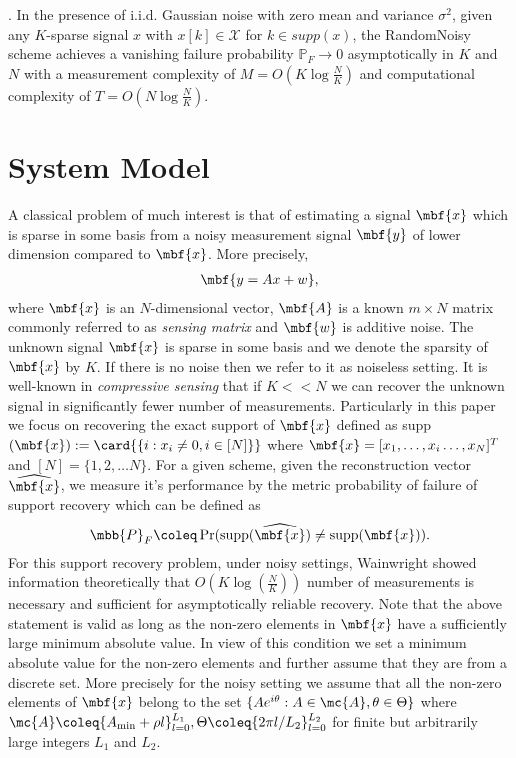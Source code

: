\documentclass[conference]{IEEEtran}
\begin{document}
\begin{theorem} \label{thm:our2}. In the presence of i.i.d. Gaussian noise with zero mean and
variance $\sigma^2$, given any $K$-sparse signal $x$ with $x[k] \in \mathcal{X}$ for $k \in supp (x)$, the RandomNoisy scheme achieves a vanishing failure probability $\mathbb{P}_F \rightarrow 0$ asymptotically in $K$ and $N$ with a measurement complexity of $M = O \left( K \log \frac{N}{K} \right)$ and computational complexity of $T = O \left( N \log \frac{N}{K} \right)$.
\end{theorem}

\section{System Model}
A classical problem of much interest is that of estimating a signal $\mbf{x}$ which is sparse in some basis from a noisy measurement signal $\mbf{y}$ of lower dimension compared to $\mbf{x}$. More precisely,
\begin{align*}
\mbf{y=Ax+w},
\end{align*}
where $\mbf{x}$ is an $N$-dimensional vector, $\mbf{A}$ is a known $m\times N$ matrix commonly referred to as \emph{sensing matrix} and $\mbf{w}$ is additive noise. The unknown signal $\mbf{x}$ is sparse in some basis and we denote the sparsity of $\mbf{x}$ by $K$. If there is no noise then we refer to it as noiseless setting. It is well-known in \emph{compressive sensing} that if $K<< N$ we can recover the unknown signal in significantly fewer number of measurements.  Particularly in this paper we focus on recovering the exact support of $\mbf{x}$ defined as supp$(\mbf{x}):=\card{\{i:x_i\neq 0, i\in[N]\}}$ where $\mbf{x}=[x_1,\ldots , x_i \ldots ,x_N]^{T}$ and $[N]=\{1,2,\ldots N\}$. For a given scheme, given the reconstruction vector $\widehat{\mbf{x}}$, we measure it's performance by the metric probability of failure of support recovery which can be defined as
\begin{align*}
\mbb{P}_{F}\coleq\Pr(\text{supp}(\widehat{\mbf{x}})\neq \text{supp}(\mbf{x})).
\end{align*}
For this support recovery problem, under noisy settings, Wainwright \cite{wainwright2009information} showed information theoretically that $O\left(K\log(\frac{N}{K})\right)$ number of measurements is necessary and sufficient for asymptotically reliable recovery. Note that the above statement is valid as long as the non-zero elements in $\mbf{x}$ have a sufficiently large minimum absolute value. In view of this condition we set a minimum absolute value for the non-zero elements and further assume that they are from a discrete set. More precisely for the noisy setting we assume that all the non-zero elements of $\mbf{x}$ belong to the set $\{Ae^{i\theta}:A\in\mc{A},\theta\in\Theta\}$ where $\mc{A}\coleq \{A_{\text{min}}+\rho l\}^{L_1}_{l=0},\Theta\coleq\{2\pi l/L_2\}_{l=0}^{L_2}$ for finite but arbitrarily large integers $L_1$ and $L_2$.
\end{document}
